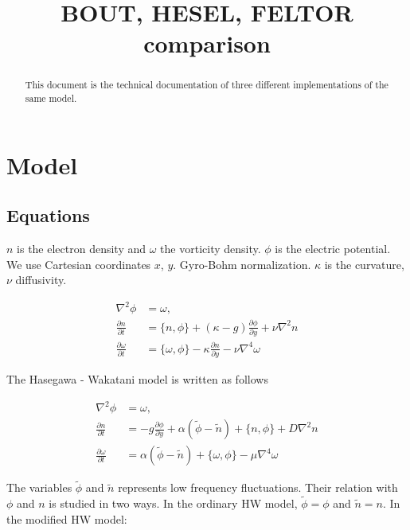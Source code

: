 \documentclass{hitec} %
\begin{document}
\title{BOUT, HESEL, FELTOR comparison}
\maketitle

\begin{abstract}
This document is the technical documentation of three different implementations of the same model.
\end{abstract}

\section{Model}
\subsection{Equations}
 $n$ is the electron density and $\omega$
the vorticity density. $\phi$ is the electric potential. We
use Cartesian coordinates $x$, $y$. Gyro-Bohm normalization. $\kappa$ is
the curvature, $\nu$ diffusivity.

\begin{subequations}
\begin{align}
 \nabla^2 \phi & =  \omega, \quad \\
 \frac{\partial n}{\partial t}    & =
    \{ n, \phi\}
  + (\kappa - g) \frac{\partial \phi}{\partial y}
  + \nu \nabla^2 n  \\  
  \frac{\partial \omega}{\partial t} & =
  \{ \omega, \phi\}
  - \kappa\frac{\partial n}{\partial y} -\nu\nabla^4\omega
\end{align}
\end{subequations}

The Hasegawa - Wakatani model is written as follows

\begin{subequations}
\begin{align}
 \nabla^2 \phi & =  \omega, \quad \\
 \frac{\partial n}{\partial t}     & =  - g \frac{\partial \phi}{\partial y} + \alpha (\tilde{\phi} - \tilde{n})
 + \{n, \phi\} + D \nabla^2 n \\
  \frac{\partial \omega}{\partial t} & =  \alpha ( \tilde{\phi} - \tilde{n}) + \{ \omega, \phi\}
- \mu\nabla^4\omega
\end{align}
\end{subequations}

The variables $\tilde{\phi}$ and $\tilde{n}$ represents low frequency fluctuations. Their relation with $\phi$ and $n$ is studied in two ways. In the ordinary HW model, $\tilde{\phi} = \phi$ and $\tilde{n} = n$. In the modified HW model: 
\end{document}
